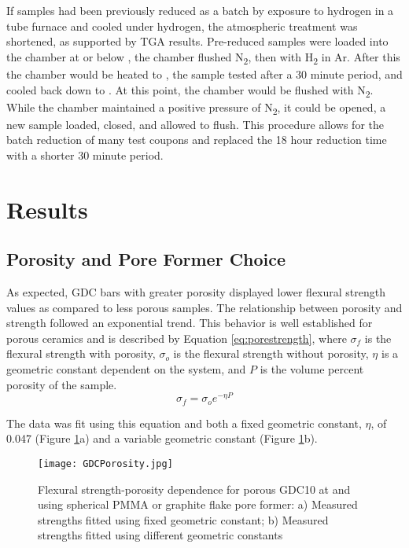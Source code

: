 If samples had been previously reduced as a batch by exposure to hydrogen in a tube furnace and cooled under hydrogen, the atmospheric treatment was shortened, as supported by TGA results.
Pre-reduced samples were loaded into the chamber at or below , the chamber flushed N\textsubscript{2}, then with H\textsubscript{2} in Ar.
After this the chamber would be heated to , the sample tested after a 30
minute period, and cooled back down to .
At this point, the chamber would be flushed with N\textsubscript{2}.
While the chamber maintained a positive pressure of N\textsubscript{2}, it could be opened, a new sample loaded, closed, and allowed to flush.
This procedure allows for the batch reduction of many test coupons and replaced the 18 hour reduction time with a shorter 30 minute period.

\section{Results}

\subsection{Porosity and Pore Former Choice}

As expected, GDC bars with greater porosity displayed lower flexural strength values as compared to less porous samples.
The relationship between porosity and strength followed an exponential trend.
This behavior is well established for porous ceramics and is described by
Equation \ref{eq:porestrength}, where \(\sigma_{f}\) is the flexural strength with porosity,
\(\sigma_{o}\) is the flexural strength without porosity, \(\eta\) is a geometric constant dependent on the system, and \(P\) is the volume percent porosity of the sample.\cite{Rice1998}
\begin{equation}
    \sigma_f = \sigma_o e^{-\eta{}P}
    \label{eq:porestrength}
\end{equation}

The data was fit using this equation and both a fixed geometric constant, $\eta$, of 0.047 (Figure \ref{fig:gdcporsity}a) and a variable geometric constant (Figure \ref{fig:gdcporsity}b).

\begin{figure}
    \texttt{[image: GDCPorosity.jpg]}
    \caption{Flexural strength-porosity dependence for porous GDC10 at
     and  using spherical PMMA or graphite flake pore former: a)
    Measured strengths fitted using fixed geometric constant; b) Measured strengths fitted using different geometric constants}
    \label{fig:gdcporsity}
\end{figure}

